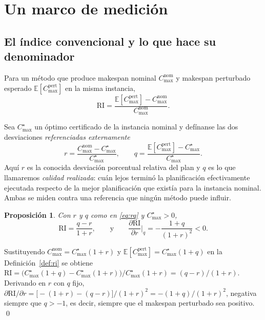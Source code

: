 \documentclass[a4paper,fleqn]{cas-sc}
\newtheorem{proposition}{Proposición}
\newcommand{\Cmax}{C_{\max}}
\newcommand{\RI}{\mathrm{RI}}
\begin{document}
\section{Un marco de medición}\label{sec:framework}

\subsection{El índice convencional y lo que hace su denominador}

\begin{definition}\label{def:ri}
Para un método que produce makespan nominal $\Cmax^{\text{nom}}$ y makespan
perturbado esperado $\mathbb{E}[\Cmax^{\text{pert}}]$ en la misma instancia,
\[
  \RI=\frac{\mathbb{E}[\Cmax^{\text{pert}}]-\Cmax^{\text{nom}}}{\Cmax^{\text{nom}}}.
\]
\end{definition}

Sea $\Cmax^{\star}$ un óptimo certificado de la instancia nominal y defínanse
las dos desviaciones \emph{referenciadas externamente}
\begin{equation}\label{eq:rq}
  r=\frac{\Cmax^{\text{nom}}-\Cmax^{\star}}{\Cmax^{\star}},
  \qquad
  q=\frac{\mathbb{E}[\Cmax^{\text{pert}}]-\Cmax^{\star}}{\Cmax^{\star}} .
\end{equation}
Aquí $r$ es la conocida desviación porcentual relativa del plan y $q$ es lo que
llamaremos \emph{calidad realizada}: cuán lejos terminó la planificación
efectivamente ejecutada respecto de la mejor planificación que existía para la
instancia nominal. Ambas se miden contra una referencia que ningún método puede
influir.

\begin{proposition}\label{prop:ri}
Con $r$ y $q$ como en \eqref{eq:rq} y $\Cmax^{\star}>0$,
\begin{equation}\label{eq:decomp}
  \RI=\frac{q-r}{1+r},
  \qquad\text{y}\qquad
  \frac{\partial \RI}{\partial r}\bigg|_{q}=-\frac{1+q}{(1+r)^{2}}<0 .
\end{equation}
\end{proposition}

\begin{pf}
Sustituyendo $\Cmax^{\text{nom}}=\Cmax^{\star}(1+r)$ y
$\mathbb{E}[\Cmax^{\text{pert}}]=\Cmax^{\star}(1+q)$ en la
Definición~\ref{def:ri} se obtiene
$\RI=\big(\Cmax^{\star}(1+q)-\Cmax^{\star}(1+r)\big)/\Cmax^{\star}(1+r)
=(q-r)/(1+r)$. Derivando en $r$ con $q$ fijo,
$\partial\RI/\partial r=\big[-(1+r)-(q-r)\big]/(1+r)^2=-(1+q)/(1+r)^2$, negativa
siempre que $q>-1$, es decir, siempre que el makespan perturbado sea positivo.
\qed
\end{pf}
\end{document}

